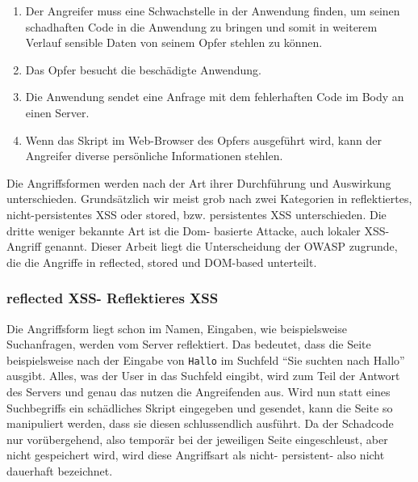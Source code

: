 \begin{enumerate}
	\item Der Angreifer muss eine Schwachstelle in der Anwendung finden, um seinen schadhaften Code in die Anwendung zu bringen und somit in weiterem Verlauf sensible Daten von seinem Opfer stehlen zu können.
	\item Das Opfer besucht die beschädigte Anwendung.
	\item Die Anwendung sendet eine Anfrage mit dem fehlerhaften
	Code im Body an einen Server.
	\item Wenn das Skript im Web-Browser des Opfers ausgeführt
	wird, kann der Angreifer diverse persönliche Informationen
	stehlen.
\end{enumerate}

Die Angriffsformen werden nach der Art ihrer Durchführung und Auswirkung unterschieden.  Grundsätzlich wir meist grob nach zwei Kategorien in reflektiertes, nicht-persistentes XSS oder stored, bzw. persistentes XSS unterschieden. Die dritte weniger bekannte Art ist die Dom- basierte Attacke, auch lokaler XSS- Angriff genannt. Dieser Arbeit liegt die Unterscheidung der OWASP zugrunde, die die Angriffe in reflected, stored und DOM-based unterteilt.

\subsubsection{reflected XSS- Reflektieres XSS}
\label{subsubsection:reflected_XSS}

Die Angriffsform liegt schon im Namen, Eingaben, wie beispielsweise Suchanfragen, werden vom Server reflektiert. Das bedeutet, dass die Seite beispielsweise nach der Eingabe von \verb+Hallo+ im Suchfeld ``Sie suchten nach Hallo'' ausgibt. Alles, was der User in das Suchfeld eingibt, wird zum Teil der Antwort des Servers und genau das nutzen die Angreifenden aus. Wird nun statt eines Suchbegriffs ein schädliches Skript eingegeben und gesendet, kann die Seite so manipuliert werden, dass sie diesen schlussendlich ausführt. Da der Schadcode nur vorübergehend, also temporär bei der jeweiligen Seite eingeschleust, aber nicht gespeichert wird, wird diese Angriffsart als nicht- persistent- also nicht dauerhaft bezeichnet.

